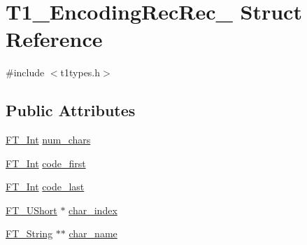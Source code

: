 \hypertarget{struct_t1___encoding_rec_rec__}{\section{T1\-\_\-\-Encoding\-Rec\-Rec\-\_\- Struct Reference}
\label{struct_t1___encoding_rec_rec__}
}


{\ttfamily \#include $<$t1types.\-h$>$}

\subsection*{Public Attributes}
\begin{DoxyCompactItemize}
\item 
\hyperlink{fttypes_8h_af90e5fb0d07e21be9fe6faa33f02484c}{F\-T\-\_\-\-Int} \hyperlink{struct_t1___encoding_rec_rec___af1468d5bad99cccebeb0387713999e9c}{num\-\_\-chars}
\item 
\hyperlink{fttypes_8h_af90e5fb0d07e21be9fe6faa33f02484c}{F\-T\-\_\-\-Int} \hyperlink{struct_t1___encoding_rec_rec___ae21aad8cbb10c8fd94e9f30c60542662}{code\-\_\-first}
\item 
\hyperlink{fttypes_8h_af90e5fb0d07e21be9fe6faa33f02484c}{F\-T\-\_\-\-Int} \hyperlink{struct_t1___encoding_rec_rec___a9be1faadf0ce11d12d3bce600e1f2a9d}{code\-\_\-last}
\item 
\hyperlink{fttypes_8h_a937f6c17cf5ffd09086d8610c37b9f58}{F\-T\-\_\-\-U\-Short} $\ast$ \hyperlink{struct_t1___encoding_rec_rec___a0c00a7b5c5ec7ba5eba667252f11f199}{char\-\_\-index}
\item 
\hyperlink{fttypes_8h_a9846214585359eb2ba6bbb0e6de30639}{F\-T\-\_\-\-String} $\ast$$\ast$ \hyperlink{struct_t1___encoding_rec_rec___acf21f77cff90336fb9f297799aaf26eb}{char\-\_\-name}
\end{DoxyCompactItemize}


